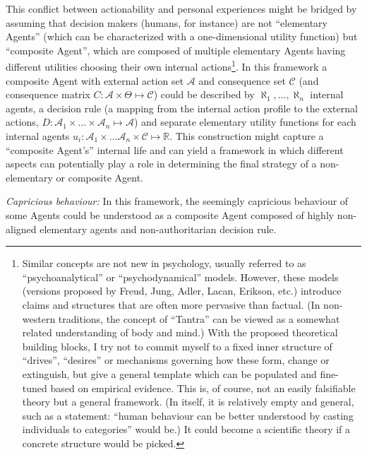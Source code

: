 \documentclass{article}
\begin{document}
This conflict between actionability and personal experiences might be bridged by assuming that decision makers (humans, for instance) are not ``elementary Agents'' (which can be characterized with a one-dimensional utility function) but ``composite Agent'', which are composed of multiple elementary Agents having different utilities choosing their own internal actions\footnote{Similar concepts are not new in psychology, usually referred to as ``psychoanalytical'' \cite{book:EncyclopediaOfPsychology,paper:Compton1983} or ``psychodynamical''  models. However, these models (versions proposed by Freud, Jung, Adler, Lacan, Erikson, etc.) introduce claims and structures that are often more pervasive than factual.
(In non-western traditions, the concept of ``Tantra'' \cite{book:TheYogaTradition} can be viewed as a somewhat related understanding of body and mind.)
With the proposed theoretical building blocks, I try not to commit myself to a fixed inner structure of ``drives'', ``desires'' or mechanisms governing how these form, change or extinguish, but give a general template which can be populated and fine-tuned based on empirical evidence. This is, of course, not an easily falsifiable theory but a general framework. (In itself, it is relatively empty and general, such as a statement: ``human behaviour can be better understood by casting individuals to categories'' would be.) It could become a scientific theory if a concrete structure would be picked.}.
In this framework a composite Agent with external action set $\mathcal{A}$ and consequence set $\mathcal{C}$ (and consequence matrix $C:\mathcal{A} \times \Theta \mapsto \mathcal{C}$) could be described by 
$\aleph_1,\dots,\aleph_n$ internal agents, a decision rule (a mapping from the internal action profile to the external actions, $D:\mathcal{A}_1 \times \dots \times \mathcal{A}_n \mapsto \mathcal{A}$) and separate elementary utility functions for each internal agents $u_i: \mathcal{A}_1 \times \dots \mathcal{A}_n \times \mathcal{C} \mapsto \mathbb{R}$.
This construction might capture a “composite Agent's” internal life and can yield a framework in which different aspects can potentially play a role in determining the final strategy of a non-elementary or composite Agent.

{\it Capricious behaviour:}
In this framework, the seemingly capricious behaviour of some Agents could be understood as a composite Agent composed of highly non-aligned elementary agents and non-authoritarian decision rule.
\end{document}
